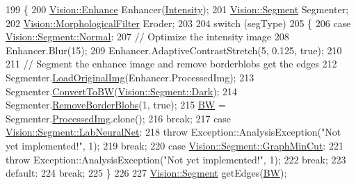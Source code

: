 \begin{DoxyCode}
199     \{
200         \hyperlink{class_vision_1_1_enhance}{Vision::Enhance} Enhancer(\hyperlink{class_soil_analyzer_1_1_soil_a6f56200f2722df5b849d8cddd094c852}{Intensity});
201         \hyperlink{class_vision_1_1_segment}{Vision::Segment} Segmenter;
202         \hyperlink{class_vision_1_1_morphological_filter}{Vision::MorphologicalFilter} Eroder;
203 
204         \textcolor{keywordflow}{switch} (segType)
205         \{
206         \textcolor{keywordflow}{case} \hyperlink{class_vision_1_1_segment_af3a2b992526eac54bca53e34cf2db4daae000cfc8d629752d6cdbba0d3d750184}{Vision::Segment::Normal}:
207             \textcolor{comment}{// Optimize the intensity image}
208             Enhancer.Blur(15);
209             Enhancer.AdaptiveContrastStretch(5, 0.125, \textcolor{keyword}{true});
210 
211             \textcolor{comment}{// Segment the enhance image and remove borderblobs get the edges}
212             Segmenter.\hyperlink{class_vision_1_1_segment_a8b5edc7f5a69d961e47f61a2191b8745}{LoadOriginalImg}(Enhancer.ProcessedImg);
213             Segmenter.\hyperlink{class_vision_1_1_segment_a4272ceb22f9cb20c6f65d9536149d3c0}{ConvertToBW}(\hyperlink{class_vision_1_1_segment_ac3ddf2c72ee6333007510b680db1e7dda962a0c0955809f63df036dbd41824c54}{Vision::Segment::Dark});
214             Segmenter.\hyperlink{class_vision_1_1_segment_a65a50340b5a1a0fb08a1b5749b7145b6}{RemoveBorderBlobs}(1, \textcolor{keyword}{true});
215             \hyperlink{class_soil_analyzer_1_1_soil_ae11b578192ebae3165f75c09d6116f74}{BW} = Segmenter.\hyperlink{class_vision_1_1_image_processing_aa7d65742882cd1b2a1e4e9cb68809211}{ProcessedImg}.clone();
216             \textcolor{keywordflow}{break};
217         \textcolor{keywordflow}{case} \hyperlink{class_vision_1_1_segment_af3a2b992526eac54bca53e34cf2db4daa6ddef558061ee58899a362608a5b163b}{Vision::Segment::LabNeuralNet}:
218             \textcolor{keywordflow}{throw} Exception::AnalysisException(\textcolor{stringliteral}{"Not yet implemented!"}, 1);
219             \textcolor{keywordflow}{break};
220         \textcolor{keywordflow}{case} \hyperlink{class_vision_1_1_segment_af3a2b992526eac54bca53e34cf2db4daa0291c0ff93e52e8e78f86698b0288353}{Vision::Segment::GraphMinCut}:
221             \textcolor{keywordflow}{throw} Exception::AnalysisException(\textcolor{stringliteral}{"Not yet implemented!"}, 1);
222             \textcolor{keywordflow}{break};
223         \textcolor{keywordflow}{default}:
224             \textcolor{keywordflow}{break};
225         \}
226 
227         \hyperlink{class_vision_1_1_segment}{Vision::Segment} getEdges(\hyperlink{class_soil_analyzer_1_1_soil_ae11b578192ebae3165f75c09d6116f74}{BW});

\end{DoxyCode}
